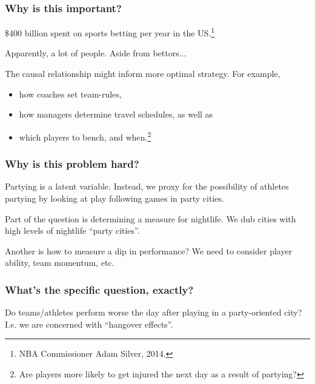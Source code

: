\documentclass{beamer}
\begin{document}
\begin{frame}   
  \frametitle{Why is this important?}
  \begin{block}{\$400 billion spent on sports betting per year in the US.\footnote{NBA Commissioner Adam Silver, 2014.}}

    Apparently, a lot of people. Aside from bettors...
  \end{block}

  \vspace{12pt}\begin{block}{The causal relationship might inform more optimal strategy.}     For example,
    \begin{itemize}       
      \item how coaches set team-rules, 
      \item how managers determine travel schedules, as well as
      \item which players to bench, and when.\footnote{Are players more likely to get injured the next day as a result of partying?}
    \end{itemize}
  \end{block}
\end{frame}

\begin{frame}   
  \frametitle{Why is this problem hard?}
  \begin{block}{Partying is a latent variable.}
    Instead, we proxy for the possibility of athletes partying by looking at 
    play following games in party cities.
  \end{block}
  \vspace{12pt}\begin{block}{Part of the question is determining a measure for nightlife. }
    We dub cities with high levels of nightlife ``party cities''.  
  \vspace{12pt}
  \begin{block}{Another is how to measure a dip in performance?}
    We need to consider player ability, team momentum, etc.
  \end{block} \end{block}
\end{frame}

\begin{frame}   \frametitle{What's the specific question, exactly?}
  \begin{block}{Do teams/athletes perform worse the day after playing in a party-oriented city?}
\vspace{12pt}     I.e. we are concerned with ``hangover effects''.

\vspace{12pt}

  \end{block}
\end{frame}
\end{document}
